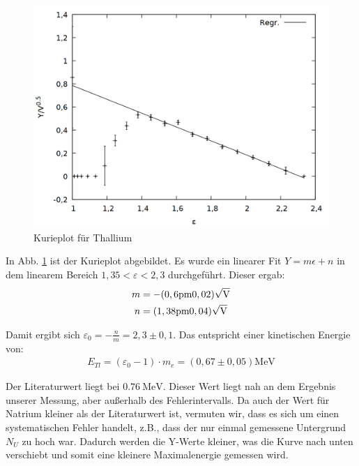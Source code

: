 \begin{figure}
\centering
\includegraphics[width=0.75\linewidth]{data/ti.png}
\caption{Kurieplot für Thallium}
\label{fig:tl}
\end{figure}

In Abb. \ref{fig:tl} ist der Kurieplot abgebildet. Es wurde ein linearer Fit $Y = m \epsilon + n$ in dem linearem Bereich $1,35 < \varepsilon < 2,3$ durchgeführt. Dieser ergab:
\begin{align*}
m &= -\si{(0,6\pm 0,02) \sqrt{\volt}}\\
n &= \si{(1,38 \pm 0,04) \sqrt{\volt}}
\end{align*}

Damit ergibt sich $\varepsilon_0 = -\frac{n}{m} = 2,3 \pm 0,1$. Das entspricht einer kinetischen Energie von:
\begin{align*}
E_{Tl} = (\varepsilon_0 - 1)\cdot m_e = \si{(0,67 \pm 0,05)\mega\eV}
\end{align*}

Der Literaturwert \cite{tlenergy} liegt bei $\SI{0,76}{\mega\eV}$. Dieser Wert liegt nah an dem Ergebnis unserer Messung, aber außerhalb des Fehlerintervalls. Da auch der Wert für Natrium kleiner als der Literaturwert ist, vermuten wir, dass es sich um einen systematischen Fehler handelt, z.B., dass der nur einmal gemessene Untergrund $N_U$ zu hoch war. Dadurch werden die Y-Werte kleiner, was die Kurve nach unten verschiebt und somit eine kleinere Maximalenergie gemessen wird.  

